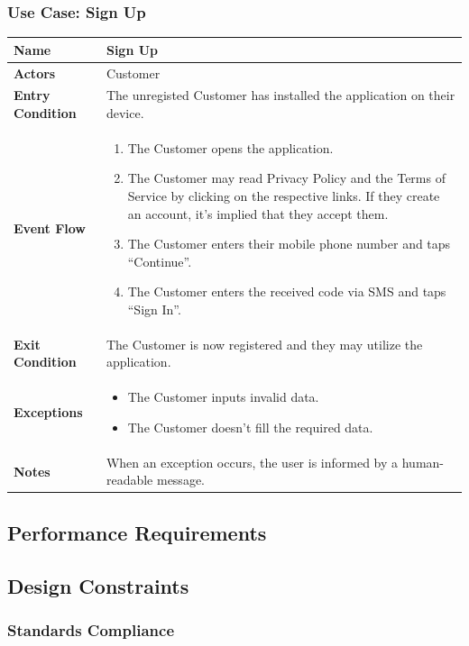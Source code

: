 \subsubsection{Use Case: Sign Up}
\begin{tabular}{|l|p{10cm}|}
    \hline
    \textbf{Name} & Sign Up \\
    \hline
    \textbf{Actors} & Customer \\
    \hline
    \textbf{Entry Condition} & The unregisted Customer has installed the application on their device. \\
    \hline
    \textbf{Event Flow} & \begin{enumerate}
        \item The Customer opens the application.
        \item The Customer may read Privacy Policy and the Terms of Service by clicking on the respective links. If they create an account, it's implied that they accept them.
        \item The Customer enters their mobile phone number and taps ``Continue''.
        \item The Customer enters the received code via SMS and taps ``Sign In''.
    \end{enumerate} \\
    \hline
    \textbf{Exit Condition} & The Customer is now registered and they may utilize the application. \\
    \hline
    \textbf{Exceptions} & \begin{itemize}
        \item The Customer inputs invalid data.
        \item The Customer doesn't fill the required data.
    \end{itemize} \\
    \hline
    \textbf{Notes} & When an exception occurs, the user is informed by a human-readable message. \\
    \hline
\end{tabular}

\subsection{Performance Requirements}
\subsection{Design Constraints}
\subsubsection{Standards Compliance}
